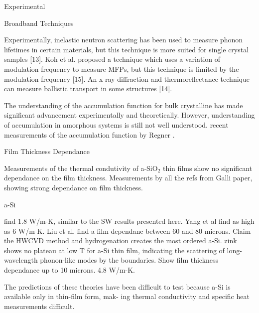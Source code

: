 \documentclass[aps,prb,twocolumn,superscriptaddress,footinbib,amsmath,amssymb,floatfix]{revtex4}
\begin{document}
Experimental

Broadband Techniques

Experimentally, inelastic neutron scattering has been
used to measure phonon lifetimes in certain materials,
but this technique is more suited for single crystal samples
[13].\cite{christianson_phonon_2008} 
Koh et al. proposed a technique which uses a variation of
modulation frequency to measure MFPs, but this technique
is limited by the modulation frequency [15].
\cite{koh_frequency_2007}
An x-ray diffraction and thermoreflectance technique
can measure ballistic transport in some structures [14].
\cite{highland_ballistic-phonon_2007}

The understanding of the accumulation function for bulk 
crystalline has made significant advancement experimentally
\cite{minnich_thermal_2011}
and 
theoretically.\cite{yang_mean_2013} However, understanding 
of accumulation in amorphous systems is still not 
well understood.
\cite{feldman_thermal_1993,feldman_numerical_1999,he_thermal_2011}
recent measurements of the accumulation function by Regner .
\cite{regner_broadband_2013}

Film Thickness Dependance

Measurements of the thermal condutivity of a-SiO$_2$ thin 
films show no significant dependance on the film thickness. 
\cite{lee_heat_1997,yamane_measurement_2002} 
Measurements by all the refs from Galli paper, showing strong
dependance on film thickness.
\cite{wada_thermal_1996,zink_thermal_2006,yang_anomalously_2010,
cahill_thermal_1994,kuo_thermal_1992,moon_thermal_2002,liu_high_2009}

a-Si

\cite{wada_thermal_1996} find 1.8 W/m-K, similar to the SW results 
presented here.
Yang et al find as high as 6 W/m-K.\cite{yang_anomalously_2010}
Liu et al. find a film dependanc between 60 and 80 microns.
\cite{liu_high_2009} Claim the HWCVD method and hydrogenation 
creates the most ordered a-Si.
zink shows no plateau at low T for a-Si thin film, indicating 
the scattering of long-wavelength phonon-like modes 
by the boundaries.\cite{zink_thermal_2006}
Show film thickness dependance up to 10 microns.
\cite{kuo_thermal_1992}
4.8 W/m-K.\cite{hasselman_thermal_1989}


The predictions of these theories have been difficult to
test because a-Si is available only in thin-film form, mak-
ing thermal conductivity and specific heat measurements
difficult.

\end{document}
